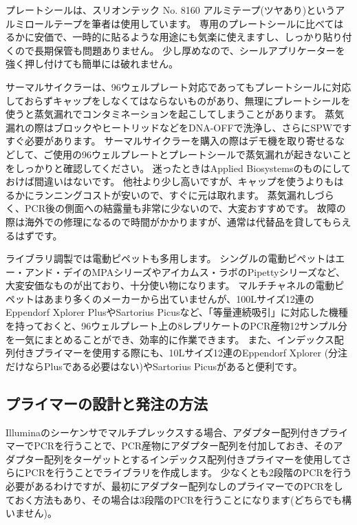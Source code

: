 \documentclass[titlepage,10pt,a4paper]{jsbook}
\begin{document}
プレートシールは、スリオンテック No. 8160 アルミテープ(ツヤあり)というアルミロールテープを筆者は使用しています。
専用のプレートシールに比べてはるかに安価で、一時的に貼るような用途にも気楽に使えますし、しっかり貼り付くので長期保管も問題ありません。
少し厚めなので、シールアプリケーターを強く押し付けても簡単には破れません。

サーマルサイクラーは、96ウェルプレート対応であってもプレートシールに対応しておらずキャップをしなくてはならないものがあり、無理にプレートシールを使うと蒸気漏れでコンタミネーションを起こしてしまうことがあります。
蒸気漏れの際はブロックやヒートリッドなどをDNA-OFFで洗浄し、さらにSPWですすぐ必要があります。
サーマルサイクラーを購入の際はデモ機を取り寄せるなどして、ご使用の96ウェルプレートとプレートシールで蒸気漏れが起きないことをしっかりと確認してください。
迷ったときはApplied Biosystemsのものにしておけば間違いはないです。
他社より少し高いですが、キャップを使うよりもはるかにランニングコストが安いので、すぐに元は取れます。
蒸気漏れしづらく、PCR後の側面への結露量も非常に少ないので、大変おすすめです。
故障の際は海外での修理になるので時間がかかりますが、通常は代替品を貸してもらえるはずです。

ライブラリ調製では電動ピペットも多用します。
シングルの電動ピペットはエー・アンド・デイのMPAシリーズやアイカムス・ラボのPipettyシリーズなど、大変安価なものが出ており、十分使い物になります。
マルチチャネルの電動ピペットはあまり多くのメーカーから出ていませんが、100{\textmu}Lサイズ12連のEppendorf Xplorer PlusやSartorius Picusなど、「等量連続吸引」に対応した機種を持っておくと、96ウェルプレート上の8レプリケートのPCR産物12サンプル分を一気にまとめることができ、効率的に作業できます。
また、インデックス配列付きプライマーを使用する際にも、10{\textmu}Lサイズ12連のEppendorf Xplorer (分注だけならPlusである必要はない)やSartorius Picusがあると便利です。

\subsection{プライマーの設計と発注の方法}

Illuminaのシーケンサでマルチプレックスする場合、アダプター配列付きプライマーでPCRを行うことで、PCR産物にアダプター配列を付加しておき、そのアダプター配列をターゲットとするインデックス配列付きプライマーを使用してさらにPCRを行うことでライブラリを作成します。
少なくとも2段階のPCRを行う必要があるわけですが、最初にアダプター配列なしのプライマーでのPCRをしておく方法もあり、その場合は3段階のPCRを行うことになります(どちらでも構いません)。
\end{document}
